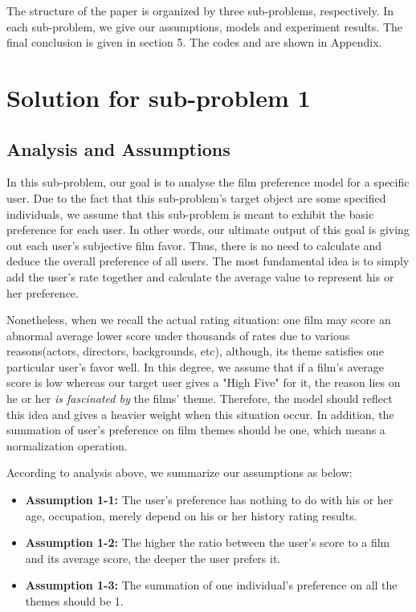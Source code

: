 The structure of the paper is organized by three sub-problems, respectively. In each sub-problem, we give our assumptions, models and experiment results. The final conclusion is given in section 5. The codes and are shown in Appendix. 




\section{Solution for sub-problem 1}
\subsection{Analysis and Assumptions}
In this sub-problem, our goal is to analyse the film preference model for a specific user. Due to the fact that this sub-problem's target object are some specified individuals, we assume that this sub-problem is meant to exhibit the basic preference for each user. In other words, our ultimate output of this goal is giving out each user's subjective film favor. Thus, there is no need to calculate and deduce the overall preference of all users. The most fundamental idea is to simply add the user's rate together and calculate the average value to represent his or her preference. 

Nonetheless, when we recall the actual rating situation: one film may score an abnormal average lower score under thousands of rates due to various reasons(actors, directors, backgrounds, etc), although, its theme satisfies one particular user's favor well. In this degree, we assume that if a film's average score is low whereas our target user gives a "High Five" for it, the reason lies on he or her \textit{is fascinated by} the films' theme. Therefore, the model should reflect this idea and gives a heavier weight when this situation occur. In addition, the summation of user's preference on film themes should be one, which means a normalization operation. 

According to analysis above, we summarize our assumptions as below:
\begin{itemize}
\item \textbf{Assumption 1-1:} The user's preference has nothing to do with his or her age, occupation, merely depend on his or her history rating results.

\item \textbf{Assumption 1-2:} The higher the ratio between the user's score to a film and its average score, the deeper the user prefers it.

\item\textbf{Assumption 1-3:} The summation of one individual's preference on all the themes should be 1.
\end{itemize} 

